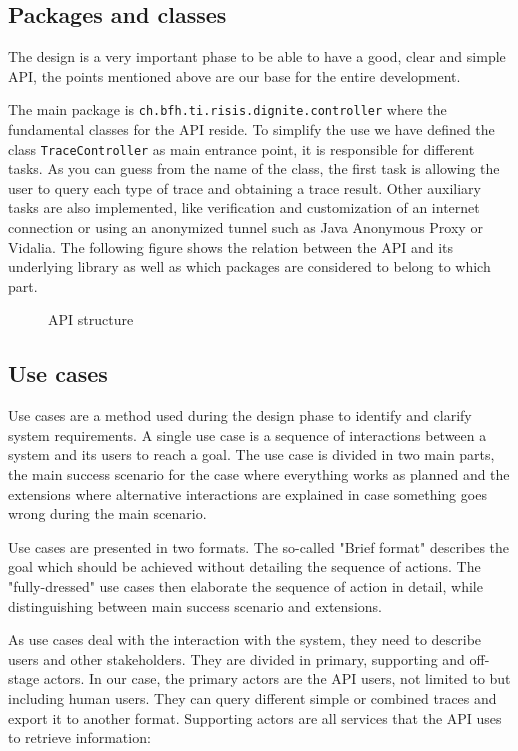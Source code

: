\documentclass[
	a4paper,					10pt,							twoside,					openright,				notitlepage,			parskip=half,			]{scrreprt}
\begin{document}
\subsection{Packages and classes}
\label{subsec:api_apistruct_packages}
The design is a very important phase to be able to have a good, clear and simple \gls{API}, 
the points mentioned above are our base for the entire development.

The main package is \verb|ch.bfh.ti.risis.dignite.controller| where the fundamental classes for the \gls{API} reside.
To simplify the use we have defined the class \verb|TraceController| as main entrance point, 
it is responsible for different tasks.
As you can guess from the name of the class, the first task is allowing the user to query each 
type of trace and obtaining a trace result.
Other auxiliary tasks are also implemented, like verification and customization of an internet connection
or using an anonymized tunnel such as Java Anonymous Proxy or Vidalia.
 \newpage
The following figure shows the relation between the \gls{API} and its underlying library as well as
which packages are considered to belong to which part.

\begin{figure}[H] 
\caption{\gls{API} structure}
\label{fig:apistructure}
\end{figure}

\subsection{Use cases}
\label{subsec:api_apistruct_usecases}
Use cases are a method used during the design phase to identify and clarify system requirements.
A single use case is a sequence of interactions between a system and its users to reach a goal. 
The use case is divided in two main parts, the main success scenario for the case where everything works as planned
and the extensions where alternative interactions are explained in case something goes wrong during the main scenario.

Use cases are presented in two formats. The so-called "Brief format" describes 
the goal which should be achieved without detailing the sequence of actions. 
The "fully-dressed" use cases then elaborate the sequence of action in detail, 
while distinguishing between main success scenario and extensions.

As use cases deal with the interaction with the system, they need to describe users and other stakeholders. 
They are divided in primary, supporting and off-stage actors.
In our case, the primary actors are the \gls{API} users, not limited to but including human users. 
They can query different simple or combined traces and export it to another format. 
Supporting actors are all services that the \gls{API} uses to retrieve information:
\end{document}
